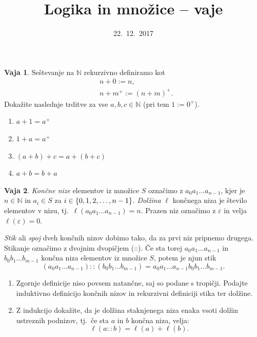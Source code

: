 \documentclass{article}
\newcommand{\NN}{\mathbb{N}}
\theoremstyle{definition}
\newtheorem{vaja}{Vaja}
\begin{document}
\title{Logika in množice -- vaje}
\date{22.~12.~2017}
\maketitle

\begin{vaja}
  Seštevanje na $\NN$ rekurzivno definiramo kot
  \begin{align*}
    &n + 0 := n, \\
    &n + m^+ := (n + m)^+.
  \end{align*}
  Dokažite naslednje trditve za vse $a, b, c \in \NN$ (pri tem $1 := 0^+$).
  \begin{enumerate}
    \item
      $a + 1 = a^+$
    \item
      $1 + a = a^+$
    \item
      $(a + b) + c = a + (b + c)$
    \item
      $a + b = b + a$
  \end{enumerate}
\end{vaja}

\begin{vaja}
	\emph{Končne nize} elementov iz množice $S$ označimo z $a_0 a_1 \ldots a_{n-1}$, kjer je $n \in \NN$ in $a_i \in S$ za $i \in \set{0, 1, 2, \ldots, n-1}$. \emph{Dolžina} $\ell$ končnega niza je število elementov v nizu, tj.~$\ell(a_0 a_1 \ldots a_{n-1}) = n$. Prazen niz označimo z $\varepsilon$ in velja $\ell(\varepsilon) = 0$.
	
	\emph{Stik} ali \emph{spoj} dveh končnih nizov dobimo tako, da za prvi niz pripnemo drugega. Stikanje označimo z dvojnim dvopičjem (::). Če sta torej $a_0 a_1 \ldots a_{n-1}$ in $b_0 b_1 \ldots b_{m-1}$ končna niza elementov iz množice $S$, potem je njun stik
	\[(a_0 a_1 \ldots a_{n-1}) :: (b_0 b_1 \ldots b_{m-1}) = a_0 a_1 \ldots a_{n-1} b_0 b_1 \ldots b_{m-1}.\]
	\begin{enumerate}
		\item
			Zgornje definicije niso povsem natančne, saj so podane s tropičji. Podajte induktivno definicijo končnih nizov in rekurzivni definiciji stika ter dolžine.
		\item
			Z indukcijo dokažite, da je dolžina staknjenega niza enaka vsoti dolžin ustreznih podnizov, tj.~če sta $a$ in $b$ končna niza, velja:
			\[\ell(a :: b) = \ell(a) + \ell(b).\]
	\end{enumerate}
\end{vaja}
\end{document}

